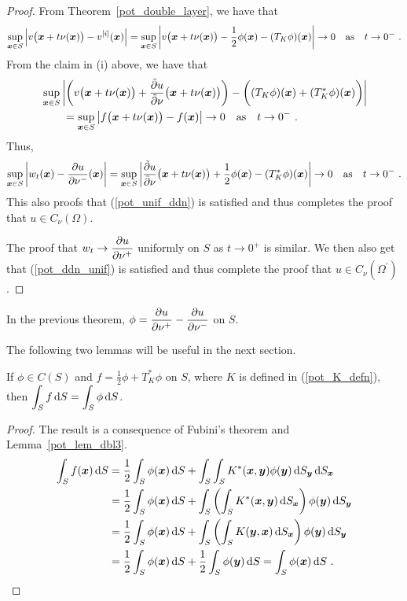 \begin{proof}
From Theorem~\ref{pot_double_layer}, we have that
\[
\sup_{{\bm{x}}\in S}
\left|v\big({\bm{x}}+t\nu({\bm{x}})\big) - v^{[i]}({\bm{x}})\right|
= \sup_{{\bm{x}}\in S}
\left|v\big({\bm{x}}+t\nu({\bm{x}})\big) -
\frac{1}{2} \phi({\bm{x}}) - (T_K \phi)({\bm{x}}) \right|
\rightarrow 0 \quad \text{as} \quad t\rightarrow 0^-\ .
\]
From the claim in (i) above, we have that
\begin{align*}
&\sup_{{\bm{x}}\in S}
\left| \left(v\big({\bm{x}}+t\nu({\bm{x}})\big)
+ \frac{\tilde{\partial}{u}}{\tilde{\partial}{\nu}}\big({\bm{x}}+t\nu({\bm{x}})\big)\right) -
\bigg( (T_K \phi)({\bm{x}}) + (T_K^\ast \phi)({\bm{x}})\bigg) \right| \\
&\qquad = \sup_{{\bm{x}}\in S}
\left| f\big({\bm{x}}+t\nu({\bm{x}})\big) - f({\bm{x}}) \right|
\rightarrow 0 \quad \text{as} \quad t \rightarrow 0^- \ .
\end{align*}
Thus,
\[
\sup_{{\bm{x}}\in S} \left| w_t({\bm{x}})
- \frac{\partial{u}}{\partial \nu^-}({\bm{x}}) \right|
= \sup_{{\bm{x}}\in S} \left| 
\frac{\tilde{\partial}{u}}{\tilde{\partial}{\nu}}\big({\bm{x}}+t\nu({\bm{x}})\big)
+ \frac{1}{2} \phi({\bm{x}}) - (T_K^\ast \phi)({\bm{x}}) \right|
\to 0 \quad \text{as} \quad
t\rightarrow 0^- \ .
\]
This also proofs
that (\ref{pot_unif_ddn}) is satisfied and thus completes the proof that
$u \in C_{\nu}(\Omega)$.

The proof that $\displaystyle w_t \rightarrow \frac{\partial{u}}{\partial \nu^+}$
uniformly on $S$ as $t\rightarrow 0^+$ is similar.  We then also get
that (\ref{pot_ddn_unif}) is satisfied and thus complete the proof
that $u \in C_{\nu}(\Omega^{\prime})$.
\end{proof}

\begin{cor} \label{pot_cor_pdpdm}
In the previous theorem,
$\displaystyle \phi = \frac{\partial{u}}{\partial \nu^+}- \frac{\partial{u}}{\partial \nu^-}$ on $S$.
\end{cor}

The following two lemmas will be useful in the next section.

\begin{lemma} \label{pot_sol_zeroB}
If $\phi \in C(S)$ and $\displaystyle f = \frac{1}{2} \phi + T^\ast_K \phi$ on
$S$, where $K$ is defined in (\ref{pot_K_defn}), then
$\displaystyle \int_{S} f \,\mathrm{d}{S} = \int_{S} \phi \,\mathrm{d}{S}$.
\end{lemma}

\begin{proof}
The result is a consequence of Fubini's theorem and
Lemma~\ref{pot_lem_dbl3}.
\begin{align*}
\int_S f({\bm{x}}) \,\mathrm{d}{S} &= \frac{1}{2} \int_S \phi({\bm{x}}) \,\mathrm{d}{S} + 
\int_S \int_S K^\ast({\bm{x}},{\bm{y}}) \phi({\bm{y}}) \,\mathrm{d}{S}_{{\bm{y}}} \,\mathrm{d}{S}_{{\bm{x}}} \\
&= \frac{1}{2} \int_S \phi({\bm{x}}) \,\mathrm{d}{S} + 
\int_S \left( \int_S K^\ast({\bm{x}},{\bm{y}}) \,\mathrm{d}{S}_{{\bm{x}}} \right)
\phi({\bm{y}}) \,\mathrm{d}{S}_{{\bm{y}}} \\
&= \frac{1}{2} \int_S \phi({\bm{x}}) \,\mathrm{d}{S} + 
\int_S \left( \int_S K({\bm{y}},{\bm{x}}) \,\mathrm{d}{S}_{{\bm{x}}} \right)
\phi({\bm{y}}) \,\mathrm{d}{S}_{{\bm{y}}} \\
&= \frac{1}{2} \int_S \phi({\bm{x}}) \,\mathrm{d}{S}
+ \frac{1}{2} \int_S \phi({\bm{y}}) \,\mathrm{d}{S}
= \int_S \phi({\bm{x}}) \,\mathrm{d}{S} \ . \qedhere
\end{align*}
\end{proof}

